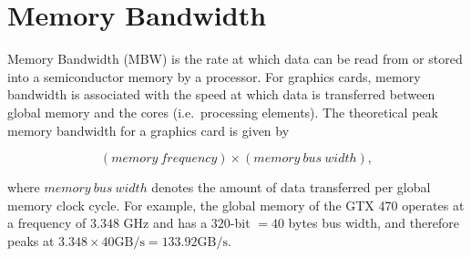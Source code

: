 \documentclass[11pt,twoside]{report}
\begin{document}



\section{Memory Bandwidth}
\label{app:MBW}
Memory Bandwidth (MBW) is the rate at which data can be read from or stored into a semiconductor memory by a processor. For graphics cards, memory bandwidth is associated with the speed at which data is transferred between global memory and the cores (i.e.\ processing elements). The theoretical peak memory bandwidth for a graphics card is given by

\begin{equation}
	(memory~frequency)\times(memory~bus~width) ,
\end{equation}


\noindent where $memory~bus~width$ denotes the amount of data transferred per global memory clock cycle. For example, the global memory of the GTX 470 operates at a frequency of $3.348$ GHz and has a $320$-bit $= 40$ bytes bus width, and therefore peaks at $3.348\times40 \mbox{GB/s} = 133.92 \mbox{GB/s}$.
\end{document}

